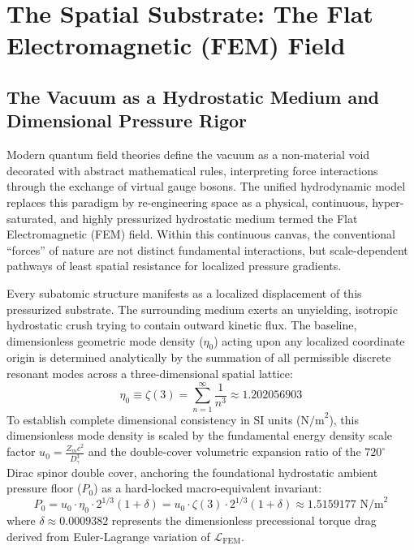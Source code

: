 \documentclass[11pt,a4paper]{article}
\begin{document}
	\clearpage
	\tableofcontents
	\clearpage
	
	\section{The Spatial Substrate: The Flat Electromagnetic (FEM) Field}
	
	\subsection{The Vacuum as a Hydrostatic Medium and Dimensional Pressure Rigor}
	Modern quantum field theories define the vacuum as a non-material void decorated with abstract mathematical rules, interpreting force interactions through the exchange of virtual gauge bosons. The unified hydrodynamic model replaces this paradigm by re-engineering space as a physical, continuous, hyper-saturated, and highly pressurized hydrostatic medium termed the Flat Electromagnetic (FEM) field. Within this continuous canvas, the conventional ``forces'' of nature are not distinct fundamental interactions, but scale-dependent pathways of least spatial resistance for localized pressure gradients.
	
	Every subatomic structure manifests as a localized displacement of this pressurized substrate. The surrounding medium exerts an unyielding, isotropic hydrostatic crush trying to contain outward kinetic flux. The baseline, dimensionless geometric mode density ($\eta_0$) acting upon any localized coordinate origin is determined analytically by the summation of all permissible discrete resonant modes across a three-dimensional spatial lattice:
	\begin{equation}
		\eta_0 \equiv \zeta(3) = \sum_{n=1}^{\infty} \frac{1}{n^3} \approx 1.202056903
	\end{equation}
	To establish complete dimensional consistency in SI units ($\text{N/m}^2$), this dimensionless mode density is scaled by the fundamental energy density scale factor $u_0 = \frac{Z_m c^2}{D_\gamma^3}$ and the double-cover volumetric expansion ratio of the $720^\circ$ Dirac spinor double cover, anchoring the foundational hydrostatic ambient pressure floor ($P_0$) as a hard-locked macro-equivalent invariant:
	\begin{equation}
		P_0 = u_0 \cdot \eta_0 \cdot 2^{1/3} (1 + \delta) = u_0 \cdot \zeta(3) \cdot 2^{1/3} (1 + \delta) \approx 1.5159177 \text{ N/m}^2
	\end{equation}
	where $\delta \approx 0.0009382$ represents the dimensionless precessional torque drag derived from Euler-Lagrange variation of $\mathcal{L}_{\text{FEM}}$.
	
\end{document}
